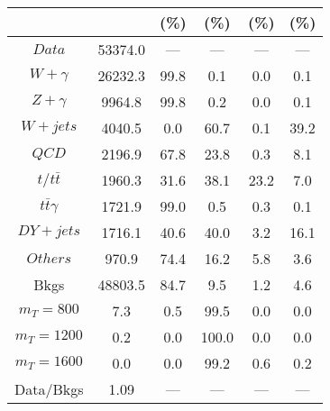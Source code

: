 \begin{figure}
\begin{minipage}[c]{0.32\textwidth}
{\begin{tabular}{cccccc}
 &  & (\%) & (\%) & (\%) & (\%)  \\
\hline
                                                                      $ Data $ &  53374.0 &  --- &  --- &  --- &  ---\\
$ W+\gamma $ &  26232.3 &  99.8 &  0.1 &  0.0 &  0.1\\
$ Z+\gamma $ &  9964.8 &  99.8 &  0.2 &  0.0 &  0.1\\
$ W+jets $ &  4040.5 &  0.0 &  60.7 &  0.1 &  39.2\\
$ QCD $ &  2196.9 &  67.8 &  23.8 &  0.3 &  8.1\\
$ t/t\bar{t} $ &  1960.3 &  31.6 &  38.1 &  23.2 &  7.0\\
$ t\bar{t}\gamma $ &  1721.9 &  99.0 &  0.5 &  0.3 &  0.1\\
$ DY+jets $ &  1716.1 &  40.6 &  40.0 &  3.2 &  16.1\\
$ Others $ &  970.9 &  74.4 &  16.2 &  5.8 &  3.6\\
Bkgs &  48803.5 &  84.7 &  9.5 &  1.2 &  4.6\\
$ m_{T} = 800 $ &  7.3 &  0.5 &  99.5 &  0.0 &  0.0\\
$ m_{T} = 1200 $ &  0.2 &  0.0 &  100.0 &  0.0 &  0.0\\
$ m_{T} = 1600 $ &  0.0 &  0.0 &  99.2 &  0.6 &  0.2\\
Data/Bkgs &  1.09 &  --- &  --- &  --- &  ---\\
\hline
\end{tabular}
}
\end{minipage}
\end{figure}

